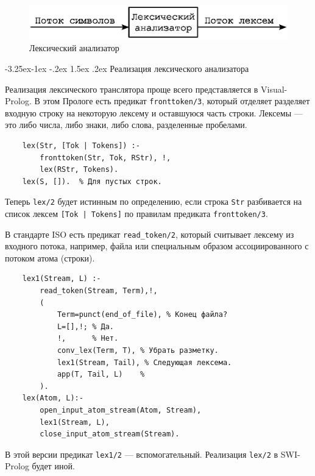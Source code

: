 \documentclass[12pt, openany, twoside]{book} %
\makeatletter
\renewcommand\subsubsection{\@startsection{subsubsection}{3}{\z@}%
                                     {-3.25ex\@plus -1ex \@minus -.2ex}%
                                     {1.5ex \@plus .2ex}%
                                     {\normalfont\normalsize\bfseries}}
\makeatother
\begin{document}
\begin{figure}[htbp]
\begin{center}
\includegraphics[scale=0.7]{pics/lex_anal.eps}
\end{center}
\caption{Лексический анализатор}\label{pic:lex_anal}
\end{figure}

\subsubsection{Реализация лексического анализатора}


Реализация лексического транслятора проще всего представляется в Visual-Prolog. В этом Прологе есть предикат  {\tt fronttoken/3}, который отделяет разделяет входную строку на некоторую лексему и оставшуюся часть строки. Лексемы --- это либо числа, либо знаки, либо слова, разделенные пробелами.
{\tt\begin{verbatim}
    lex(Str, [Tok | Tokens]) :-
        fronttoken(Str, Tok, RStr), !,
        lex(RStr, Tokens).
    lex(S, []).  % Для пустых строк.
\end{verbatim}}
\noindent Теперь {\tt lex/2} будет истинным по определению, если строка {\tt Str} разбивается на список лексем {\tt [Tok | Tokens]} по правилам предиката {\tt fronttoken/3}.

В стандарте ISO есть предикат \texttt{read\_token/2}, который считывает лексему из входного потока, например, файла или специальным образом ассоциированного с потоком атома (строки).
{\tt\begin{verbatim}
    lex1(Stream, L) :-
        read_token(Stream, Term),!,
        (
            Term=punct(end_of_file), % Конец файла?
            L=[],!; % Да.
            !,      % Нет.
            conv_lex(Term, T), % Убрать разметку.
            lex1(Stream, Tail), % Следующая лексема.
            app(T, Tail, L)    %
        ).
    lex(Atom, L):-
        open_input_atom_stream(Atom, Stream),
        lex1(Stream, L),
        close_input_atom_stream(Stream).
\end{verbatim}}
В этой версии предикат \texttt{lex1/2} --- вспомогательный. Реализация \texttt{lex/2} в SWI-Prolog будет иной.
\end{document}
